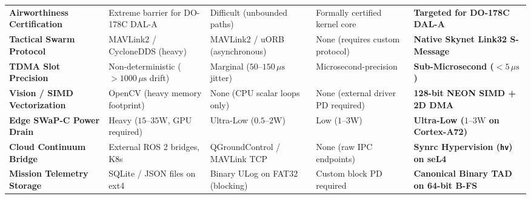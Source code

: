 \documentclass[10pt,journal,compsoc,twocolumn]{article}
\begin{document}
\begin{table}[t]
\begin{tabularx}{\textwidth}{@{} >{\raggedright\arraybackslash\bfseries}p{2.8cm} >{\raggedright\arraybackslash}X >{\raggedright\arraybackslash}X >{\raggedright\arraybackslash}X >{\raggedright\arraybackslash}X @{}}
Airworthiness Certification & Extreme barrier for DO-178C DAL-A & Difficult (unbounded paths) & Formally certified kernel core & \textbf{Targeted for DO-178C DAL-A} \\
Tactical Swarm Protocol & MAVLink2 / CycloneDDS (heavy) & MAVLink2 / uORB (asynchronous) & None (requires custom protocol) & \textbf{Native Skynet Link32 S-Message} \\
TDMA Slot Precision & Non-deterministic ($>1000\,\mu\text{s}$ drift) & Marginal ($50\text{--}150\,\mu\text{s}$ jitter) & Microsecond-precision & \textbf{Sub-Microsecond ($<5\,\mu\text{s}$)} \\
Vision / SIMD Vectorization & OpenCV (heavy memory footprint) & None (CPU scalar loops only) & None (external driver PD required) & \textbf{128-bit NEON SIMD + 2D DMA} \\
Edge SWaP-C Power Drain & Heavy ($15\text{--}35\text{W}$, GPU required) & Ultra-Low ($0.5\text{--}2\text{W}$) & Low ($1\text{--}3\text{W}$) & \textbf{Ultra-Low ($1\text{--}3\text{W}$ on Cortex-A72)} \\
Cloud Continuum Bridge & External ROS 2 bridges, K8s & QGroundControl / MAVLink TCP & None (raw IPC endpoints) & \textbf{Synrc Hypervision (\texttt{hv}) on seL4} \\
Mission Telemetry Storage & SQLite / JSON files on ext4 & Binary ULog on FAT32 (blocking) & Custom block PD required & \textbf{Canonical Binary TAD on 64-bit B-FS} \\
\bottomrule
\end{tabularx}
\end{table}
\end{document}
